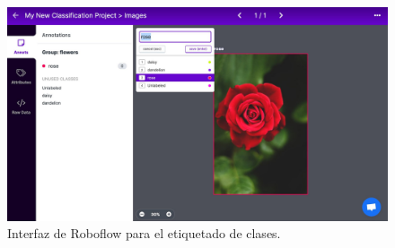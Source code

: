 \begin{figure}[!ht]
  \centering
  \includegraphics[width=.49\linewidth]{images/roboflow_labeling.jpg}
  \caption{Interfaz de Roboflow para el etiquetado de clases.}
  \label{fig:roboflow_labeling}
\end{figure}




